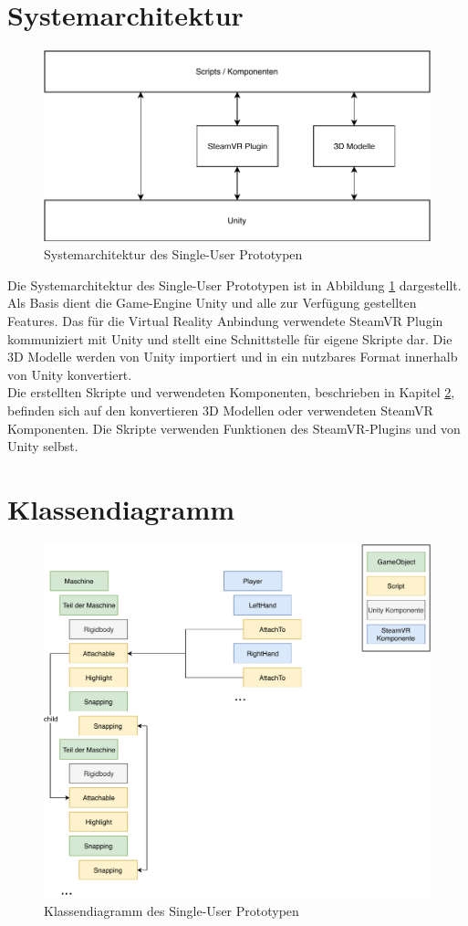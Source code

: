 \section{Systemarchitektur}
\label{ch:systemarchitektur_single_user}
\begin{figure}[h!]
	\centering
	\includegraphics[keepaspectratio,width=0.65\linewidth]{img/ArchitekturT1.pdf}
	\caption{Systemarchitektur des Single-User Prototypen}
	\label{fig:systemarchitektur_single_user}
\end{figure}

Die Systemarchitektur des Single-User Prototypen ist in Abbildung \ref{fig:systemarchitektur_single_user} dargestellt. Als Basis dient die Game-Engine Unity und alle zur Verfügung gestellten Features. Das für die Virtual Reality Anbindung verwendete SteamVR Plugin kommuniziert mit Unity und stellt eine Schnittstelle für eigene Skripte dar. Die 3D Modelle werden von Unity importiert und in ein nutzbares Format innerhalb von Unity konvertiert. \\
Die erstellten Skripte und verwendeten Komponenten, beschrieben in Kapitel \ref{ch:klassendiagram_single_user}, befinden sich auf den konvertieren 3D Modellen oder verwendeten SteamVR Komponenten. Die Skripte verwenden Funktionen des SteamVR-Plugins und von Unity selbst.


\section{Klassendiagramm}
\label{ch:klassendiagram_single_user}

\begin{figure}[h!]
	\centering
	\includegraphics[keepaspectratio,width=0.75\linewidth]{img/Klassendiagramm_T1.pdf}
	\caption{Klassendiagramm des Single-User Prototypen}
	\label{fig:klassendiagramm_single_user}
\end{figure}

